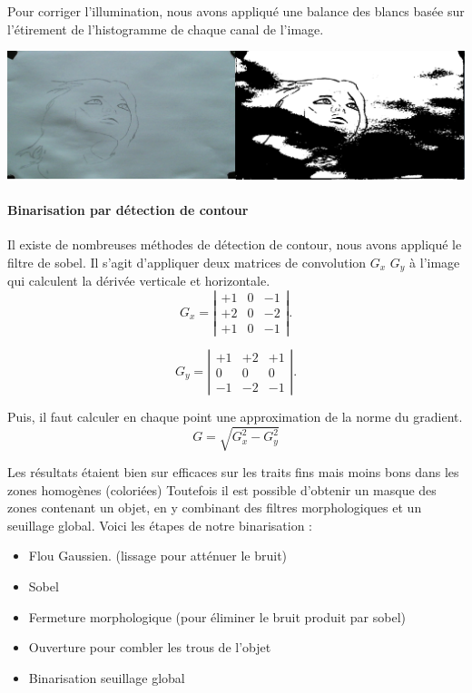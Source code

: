 Pour corriger l'illumination, nous avons appliqué une balance des blancs basée sur l'étirement de l'histogramme de chaque canal de l'image.

\begin{center}
\includegraphics[width=\textwidth]{images/Threshold.png}
\end{center}

\paragraph{Binarisation par détection de contour\vspace{0.5cm}\\}

Il existe de nombreuses méthodes de détection de contour, nous avons appliqué le filtre de sobel.
Il s'agit d'appliquer deux matrices de convolution $G_x$ $G_y$ à l'image qui calculent la dérivée verticale et horizontale. 
\[ G_x = \left| \begin{array}{ccc}
+1 & 0 & -1 \\
+2 & 0 & -2 \\
+1 & 0 & -1 \end{array} \right|.\] 

\[ G_y = \left| \begin{array}{ccc}
+1 & +2 & +1 \\
0 & 0 & 0 \\
-1 & -2 & -1 \end{array} \right|.\] 

Puis, il faut calculer en chaque point une approximation de la norme du gradient. 
\[ G = \sqrt{G_x^2 - G_y^2} \]


Les résultats étaient bien sur efficaces sur les traits fins mais moins bons dans les zones homogènes (coloriées)
Toutefois il est possible d'obtenir un masque des zones contenant un objet, en y combinant des filtres morphologiques et un seuillage global.
Voici les étapes de notre binarisation :

\begin{itemize}
   \item Flou Gaussien. (lissage pour atténuer le bruit) 
   \item Sobel
   \item Fermeture morphologique (pour éliminer le bruit produit par sobel)
   \item Ouverture pour combler les trous de l'objet 
   \item Binarisation seuillage global
\end{itemize} 

